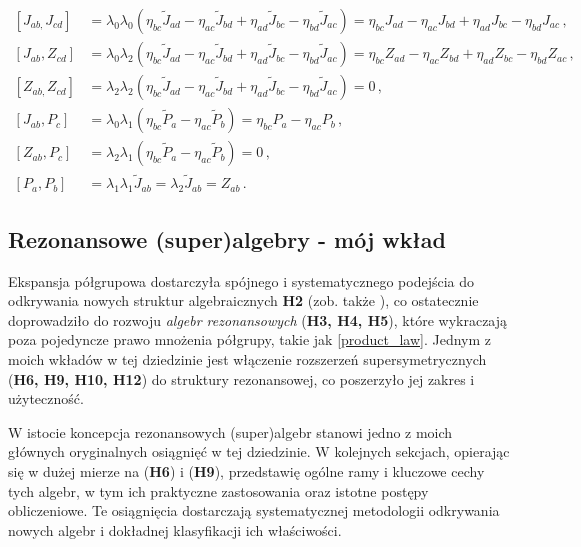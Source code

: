 \documentclass[12pt,a4paper]{article}
\begin{document}
\begin{align}
	\left[  J_{ab,}J_{cd}\right]   &  =\lambda_0\lambda_0(\eta_{bc}\tilde{J}_{ad}-\eta_{ac}\tilde{J}_{bd}+\eta
	_{ad}\tilde{J}_{bc}-\eta_{bd}\tilde{J}_{ac})=\eta_{bc}J_{ad}-\eta_{ac}J_{bd}+\eta
	_{ad}J_{bc}-\eta_{bd}J_{ac}\,,\nonumber\\
	\left[  J_{ab},Z_{cd}\right]   &  =\lambda_0\lambda_2(\eta_{bc}\tilde{J}_{ad}-\eta_{ac}\tilde{J}_{bd}+\eta
	_{ad}\tilde{J}_{bc}-\eta_{bd}\tilde{J}_{ac})=\eta_{bc}Z_{ad}-\eta_{ac}Z_{bd}+\eta
	_{ad}Z_{bc}-\eta_{bd}Z_{ac}\,,\nonumber\\
	\left[  Z_{ab,}Z_{cd}\right]   &  =\lambda_2\lambda_2(\eta_{bc}\tilde{J}_{ad}-\eta_{ac}\tilde{J}_{bd}+\eta
	_{ad}\tilde{J}_{bc}-\eta_{bd}\tilde{J}_{ac})=0\,,\nonumber\\
	\left[  J_{ab}%
	,P_{c}\right] & =\lambda_0\lambda_1(\eta_{bc}\tilde{P}_{a}-\eta_{ac}\tilde{P}_{b})=\eta_{bc}P_{a}-\eta_{ac}P_{b}\,,\nonumber\\
	\left[  Z_{ab}%
	,P_{c}\right] & =\lambda_2\lambda_1(\eta_{bc}\tilde{P}_{a}-\eta_{ac}\tilde{P}_{b})=0\,,\nonumber\\
	\left[  P_{a},P_{b}\right]   & =\lambda_1\lambda_1\tilde{J}_{ab}=\lambda_2\tilde{J}_{ab}=Z_{ab}\,.
\end{align}

\subsection{Rezonansowe (super)algebry - mój wkład}

Ekspansja półgrupowa dostarczyła spójnego i systematycznego podejścia do odkrywania nowych struktur algebraicznych \textbf{H2} (zob. także \cite{Izaurieta:2006zz, Andrianopoli:2013ooa}), co ostatecznie doprowadziło do rozwoju \textit{algebr rezonansowych} (\textbf{H3, H4, H5}), które wykraczają poza pojedyncze prawo mnożenia półgrupy, takie jak \eqref{product_law}. Jednym z moich wkładów w tej dziedzinie jest włączenie rozszerzeń supersymetrycznych (\textbf{H6, H9, H10, H12}) do struktury rezonansowej, co poszerzyło jej zakres i użyteczność.

W istocie koncepcja rezonansowych (super)algebr stanowi jedno z moich głównych oryginalnych osiągnięć w tej dziedzinie. W kolejnych sekcjach, opierając się w dużej mierze na (\textbf{H6}) i (\textbf{H9}), przedstawię ogólne ramy i kluczowe cechy tych algebr, w tym ich praktyczne zastosowania oraz istotne postępy obliczeniowe. Te osiągnięcia dostarczają systematycznej metodologii odkrywania nowych algebr i dokładnej klasyfikacji ich właściwości.
\end{document}
